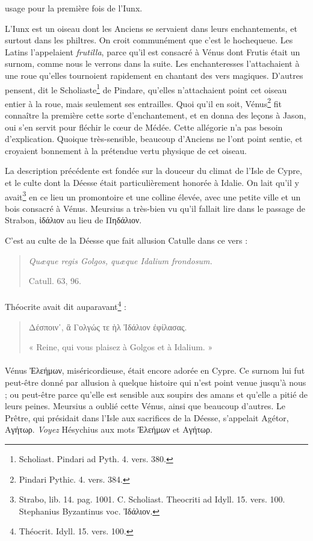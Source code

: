 \documentclass[a4paper, 18pt, oneside]{article}
\begin{document}
usage pour la première fois de l'Iunx.

L'Iunx est un oiseau dont les Anciens se servaient dans leurs enchantements, et surtout dans les philtres. On croit communément que c'est le hochequeue. Les Latins l'appelaient \emph{frutilla}, parce qu'il est consacré à Vénus dont Frutis était un surnom, comme nous le verrons dans la suite. Les enchanteresses l'attachaient à une roue qu'elles tournoient rapidement en chantant des vers magiques. D'autres pensent, dit le Scholiaste\footnote{Scholiast. Pindari ad Pyth. 4. vers. 380.} de Pindare, qu'elles n'attachaient point cet oiseau entier à la roue, mais seulement ses entrailles. Quoi qu'il en soit, Vénus\footnote{Pindari Pythic. 4. vers. 384.} fit connaître la première cette sorte d'enchantement, et en donna des leçons à Jason, oui s'en servit pour fléchir le cœur de Médée. Cette allégorie n'a pas besoin d'explication. Quoique très-sensible, beaucoup d'Anciens ne l'ont point sentie, et croyaient bonnement à la prétendue vertu physique de cet oiseau.

La description précédente est fondée sur la douceur du climat de l'Isle de Cypre, et le culte dont la Déesse était particulièrement honorée à Idalie. On lait qu'il y avait\footnote{Strabo, lib. 14. pag. 1001. C. Scholiast. Theocriti ad Idyll. 15. vers. 100. Stephanius Byzantinus voc. Ἰδάλιον.} en ce lieu un promontoire et une colline élevée, avec une petite ville et un bois consacré à Vénus. Meursius a très-bien vu qu'il fallait lire dans le passage de Strabon, ἰδάλιον au lieu de Πηδάλιον.

C'est au culte de la Déesse que fait allusion Catulle dans ce vers :
\begin{quotation}
\emph{Quæque regis Golgos, quæque Idalium frondosum.}

\hspace*{30mm}Catull. 63, 96.
\end{quotation}
\paragraph{}
Théocrite avait dit auparavant\footnote{Théocrit. Idyll. 15. vers. 100.} :
\begin{quotation}
Δέσποιν᾽, ἃ Γολγώς τε ὴλ Ἰδάλιον ἐφίλασας.

« Reine, qui vous plaisez à Golgos et à Idalium. » 
\end{quotation}
\paragraph{}
Vénus Ἐλεήμων, miséricordieuse, était encore adorée en Cypre. Ce surnom lui fut peut-être donné par allusion à quelque histoire qui n'est point venue jusqu'à nous ; ou peut-être parce qu'elle est sensible aux soupirs des amans et qu'elle a pitié de leurs peines. Meursius a oublié cette Vénus, ainsi que beaucoup d'autres. Le Prêtre, qui présidait dans l'Isle aux sacrifices de la Déesse, s'appelait Agétor, Αγήτωρ. \emph{Voyez} Hésychius aux mots Ἐλεήμων et Αγήτωρ.
\end{document}
